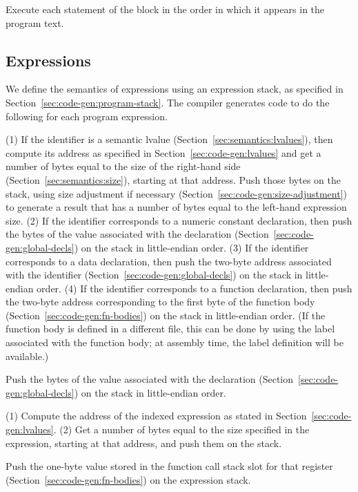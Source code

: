 \documentclass[10pt]{article}
\begin{document}
 Execute each statement of the block in the
order in which it appears in the program text.

\subsection{Expressions}
\label{sec:code-gen:expressions}

We define the semantics of expressions using an expression stack, as
specified in Section~\ref{sec:code-gen:program-stack}.  The compiler
generates code to do the following for each program expression.

 (1) If the identifier is a semantic lvalue
(Section~\ref{sec:semantics:lvalues}), then compute its address as
specified in Section~\ref{sec:code-gen:lvalues} and get a number of
bytes equal to the size of the right-hand side
(Section~\ref{sec:semantics:size}), starting at that address.  Push
those bytes on the stack, using size adjustment if necessary
(Section~\ref{sec:code-gen:size-adjustment}) to generate a result that
has a number of bytes equal to the left-hand expression size. (2) If
the identifier corresponds to a numeric constant declaration, then
push the bytes of the value associated with the declaration
(Section~\ref{sec:code-gen:global-decls}) on the stack in
little-endian order.  (3) If the identifier corresponds to a data
declaration, then push the two-byte address associated with the
identifier (Section~\ref{sec:code-gen:global-decls}) on the stack in
little-endian order. (4) If the identifier corresponds to a function
declaration, then push the two-byte address corresponding to the first
byte of the function body (Section~\ref{sec:code-gen:fn-bodies}) on
the stack in little-endian order.  (If the function body is defined in
a different file, this can be done by using the label associated with
the function body; at assembly time, the label definition will be
available.)

 Push the bytes of the value associated
with the declaration (Section~\ref{sec:code-gen:global-decls}) on the
stack in little-endian order.

 (1) Compute the address of the indexed
expression as stated in Section~\ref{sec:code-gen:lvalues}.  (2) Get a
number of bytes equal to the size specified in the expression,
starting at that address, and push them on the stack.

 Push the one-byte value stored in the
function call stack slot for that register
(Section~\ref{sec:code-gen:fn-bodies}) on the expression stack.
\end{document}
